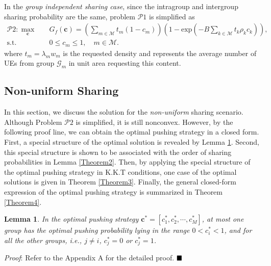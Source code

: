 \documentclass[12pt, draftclsnofoot, onecolumn]{IEEEtran}
\begin{document}
\newtheorem{proposition}{\textbf{Proposition}}[section]
\newtheorem{theorem}{\textbf{Theorem}}[section]
\newtheorem{lemma}{\textbf{Lemma}}[section]
\newtheorem{corollary}{\textbf{Corollary}}[section]

In the \textit{group independent sharing case}, since the intragroup and intergroup sharing probability are the same, problem $\mathcal{P}1$ is simplified as
\begin{subequations}
\begin{align}
 \mathcal{P}2:\mathop{\max }_{\bm{c}}
                  &\quad   G_{f}(\bm{c})= \left(\sum \limits_{m \in \mathcal{M}} t_m  (1- c_m)\right)
             \left( 1 - \textrm{exp}{(-B\sum\limits_{k \in \mathcal{M}} t_k \rho_k c_k  ) }  \right),  \\
\textrm{s.t.} &\quad 0\leq c_m \leq 1 ,\quad m \in  \mathcal{M}.
\end{align}
\end{subequations}
where $t_m=\lambda_m w_m$ is the requested density and represents the average number of UEs from group $\mathcal{G}_m$ in unit area requesting this content.

\subsection{Non-uniform Sharing}

In this section, we discuss the solution for the \textit{non-uniform} sharing scenario.
Although Problem $\mathcal{P}2$ is simplified, it is still nonconvex.
However, by the following proof line, we can obtain the optimal pushing strategy in a closed form.
First, a special structure of the optimal solution is revealed by Lemma \ref{Theorem1}.
Second, this special structure is shown to be associated with the order of sharing probabilities in Lemma \ref{Theorem2}.
Then, by applying the special structure of the optimal pushing strategy in K.K.T conditions, one case of the optimal solutions is given in Theorem \ref{Theorem3}.
Finally, the general closed-form expression of the optimal pushing strategy is summarized in Theorem \ref{Theorem4}.

\begin{lemma}\label{Theorem1}
In the optimal pushing strategy $\bm{c}^{\ast} =[c_1^{\ast}, c_2^{\ast}, \cdots, c_M^{\ast}]$, at most one group has the optimal pushing probability lying in the range $0 < c_i^{\ast} < 1$, and for all the other groups, i.e.,  $j \neq i$,  $c_j^{\ast} = 0$ or $c_j ^{\ast}= 1$.
\end{lemma}
\textit{Proof}: Refer to the Appendix A for the detailed proof.
$\hfill\blacksquare$
\end{document}
